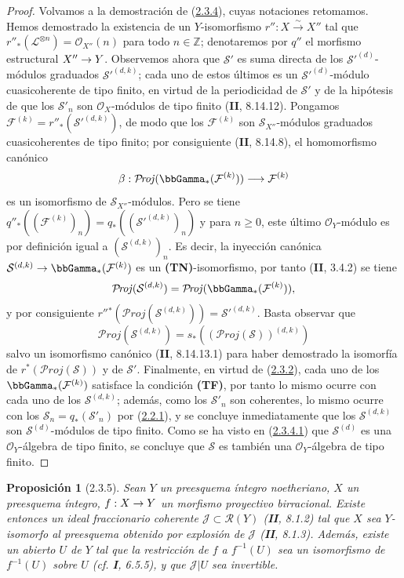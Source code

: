 \documentclass[10pt,oneside,openany]{book}
\theoremstyle{egaenv}\newtheorem*{env}{---}
\theoremstyle{egastatement}
\newtheorem*{proposition}{Proposición}
\theoremstyle{egadescription}
\newcommand{\oldpage}[2][]{\marginnote{\normalfont\scriptsize\textbf{#1}\,|\,#2}\ignorespaces}
\providecommand{\shProj}{\mathcal{P}\!\mathit{roj}}
\renewcommand{\geq}{\geqslant}
\renewcommand{\to}{\mathchoice{\longrightarrow}{\rightarrow}{\rightarrow}{\rightarrow}}
\begin{document}
\begin{proof}
Volvamos a la demostración de (\hyperref[III.2.3.4-fr]{2.3.4}), cuyas notaciones retomamos. Hemos demostrado la existencia de un $Y$-isomorfismo $r'':X\xrightarrow{\sim}X''$ tal que $r''_*(\mathcal L^{\otimes n})=\mathcal O_{X''}(n)$ para todo $n\in\mathbb Z$; denotaremos por $q''$ el morfismo estructural $X''\to Y$. Observemos ahora que $\mathcal S'$ es suma directa de los $\mathcal S'^{(d)}$-módulos graduados $\mathcal S'^{(d,k)}$; cada uno de estos últimos es un $\mathcal S'^{(d)}$-módulo cuasicoherente de tipo finito, en virtud de la periodicidad de $\mathcal S'$ y de la hipótesis de que los $\mathcal S'_n$ son $\mathcal O_X$-módulos de tipo finito (\textbf{II}, 8.14.12). Pongamos $\mathcal F^{(k)}=r''_*(\mathcal S'^{(d,k)})$, de modo que los $\mathcal F^{(k)}$ son $\mathcal S_{X''}$-módulos graduados cuasicoherentes de tipo finito; por consiguiente (\textbf{II}, 8.14.8), el homomorfismo canónico
\[
\beta:\shProj(\bbGamma_*(\mathcal F^{(k)}))
\longrightarrow\mathcal F^{(k)}
\]
es un isomorfismo de $\mathcal S_{X''}$-módulos. Pero se tiene $q''_*((\mathcal F^{(k)})_n)=q_*((\mathcal S'^{(d,k)})_n)$ y para $n\geq0$, este último $\mathcal O_Y$-módulo es por definición igual a $(\mathcal S^{(d,k)})_n$. Es decir, la inyección canónica $\mathcal S^{(d,k)}\to\bbGamma_*(\mathcal F^{(k)})$ es un \textbf{(TN)}-isomorfismo, por tanto (\textbf{II}, 3.4.2) se tiene \[
\shProj(\mathcal S^{(d,k)})
=\shProj(\bbGamma_*(\mathcal F^{(k)})),
\] y por consiguiente $r''{}^*(\shProj(\mathcal S^{(d,k)}))=\mathcal S'^{(d,k)}$. Basta observar que \[
\shProj(\mathcal S^{(d,k)})
=s_*((\shProj(\mathcal S))^{(d,k)})
\] salvo un isomorfismo canónico (\textbf{II}, 8.14.13.1) para haber demostrado la isomorfía de $r^*(\shProj(\mathcal S))$ y de $\mathcal S'$. Finalmente, en virtud de (\hyperref[III.2.3.2-fr]{2.3.2}), cada uno de los $\bbGamma_*(\mathcal F^{(k)})$ satisface la condición \textbf{(TF)}, por tanto lo mismo ocurre con cada uno de los $\mathcal S^{(d,k)}$; además, como los $\mathcal S'_n$ son coherentes, lo mismo ocurre con los $\mathcal S_n=q_*(\mathcal S'_n)$ por (\hyperref[III.2.2.1-fr]{2.2.1}), y se concluye inmediatamente que los $\mathcal S^{(d,k)}$ son $\mathcal S^{(d)}$-módulos de tipo finito. Como se ha visto en (\hyperref[III.2.3.4.1-fr]{2.3.4.1}) que $\mathcal S^{(d)}$ es una $\mathcal O_Y$-álgebra de tipo finito, se concluye que $\mathcal S$ es también una $\mathcal O_Y$-álgebra de tipo finito.
\end{proof}

\oldpage[III]{106}

\begin{proposition}[2.3.5]
\label{III.2.3.5-fr}
Sean $Y$ un preesquema íntegro noetheriano, $X$ un preesquema íntegro, $f:X\to Y$ un morfismo \textup{proyectivo birracional}. Existe entonces un ideal fraccionario coherente $\mathcal J\subset\mathcal R(Y)$ \textup{(\textbf{II}, 8.1.2)} tal que $X$ sea $Y$-isomorfo al preesquema obtenido por explosión de $\mathcal J$ \textup{(\textbf{II}, 8.1.3)}. Además, existe un abierto $U$ de $Y$ tal que la restricción de $f$ a $f^{-1}(U)$ sea un isomorfismo de $f^{-1}(U)$ sobre $U$ \textup{(cf. \textbf{I}, 6.5.5)}, y que $\mathcal J|U$ sea invertible.
\end{proposition}
\end{document}
